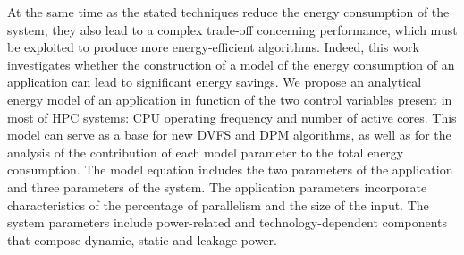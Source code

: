 At the same time as the stated techniques reduce the energy consumption of the system, they also lead to a complex trade-off concerning performance, which must be exploited to produce more energy-efficient algorithms.
Indeed, this work investigates whether the construction of a model of the energy consumption of an application can lead to significant energy savings. We propose an analytical energy model of an application in function of the two control variables present in most of HPC systems: CPU operating frequency and number of active cores. This model can serve as a base for new DVFS and DPM algorithms, as well as for the analysis of the contribution of each model parameter to the total energy consumption. The model equation includes the two parameters of the application and three parameters of the system. The application parameters incorporate characteristics of the percentage of parallelism and the size of the input. The system parameters include power-related and technology-dependent components that compose dynamic, static and leakage power.



